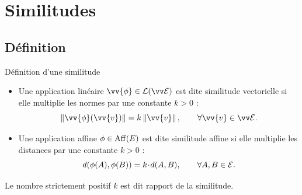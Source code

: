 \documentclass[bigger]{m53beamer}
\begin{document}
\section{Similitudes}

\subsection{Définition}
\begin{frame}{Définition d'une similitude}
  \begin{definition}
    \begin{itemize}[<+(1)->]
      \item Une application linéaire $\vv{\phi} \in \lin(\ev{E})$ est dite \alert{similitude vectorielle} si elle multiplie les normes par une constante $k > 0$ :
      \[
          \norm{\vv{\phi}(\vv{v})} = k\norm{\vv{v}},\qquad \forall \vv{v} \in \ev{E}.
      \]
      \item Une application affine $\phi  \in \operatorname{Aff}(E)$ est dite \alert{similitude affine} si elle multiplie les distances par une constante $k > 0$ :
      \[
          d(\phi(A),\phi(B)) = k\!\cdot\!d(A,B),\qquad \forall A,B \in \mathcal{E}.
      \]
    \end{itemize}\pause
    Le nombre strictement positif $k$ est dit \alert{rapport de la similitude}.
  \end{definition}
\end{frame}

\end{document}
